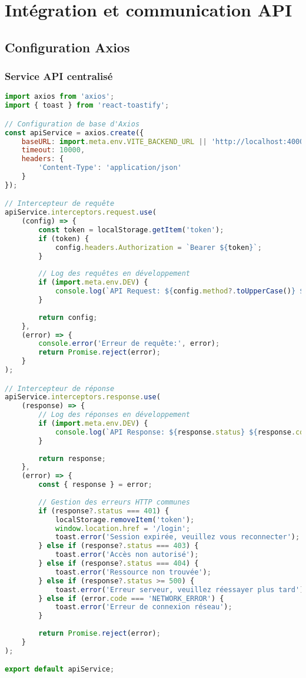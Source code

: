 \section{Intégration et communication API}

\subsection{Configuration Axios}

\subsubsection{Service API centralisé}

\begin{lstlisting}[language=JavaScript, caption=apiService.js]
import axios from 'axios';
import { toast } from 'react-toastify';

// Configuration de base d'Axios
const apiService = axios.create({
    baseURL: import.meta.env.VITE_BACKEND_URL || 'http://localhost:4000',
    timeout: 10000,
    headers: {
        'Content-Type': 'application/json'
    }
});

// Intercepteur de requête
apiService.interceptors.request.use(
    (config) => {
        const token = localStorage.getItem('token');
        if (token) {
            config.headers.Authorization = `Bearer ${token}`;
        }
        
        // Log des requêtes en développement
        if (import.meta.env.DEV) {
            console.log(`API Request: ${config.method?.toUpperCase()} ${config.url}`);
        }
        
        return config;
    },
    (error) => {
        console.error('Erreur de requête:', error);
        return Promise.reject(error);
    }
);

// Intercepteur de réponse
apiService.interceptors.response.use(
    (response) => {
        // Log des réponses en développement
        if (import.meta.env.DEV) {
            console.log(`API Response: ${response.status} ${response.config.url}`);
        }
        
        return response;
    },
    (error) => {
        const { response } = error;
        
        // Gestion des erreurs HTTP communes
        if (response?.status === 401) {
            localStorage.removeItem('token');
            window.location.href = '/login';
            toast.error('Session expirée, veuillez vous reconnecter');
        } else if (response?.status === 403) {
            toast.error('Accès non autorisé');
        } else if (response?.status === 404) {
            toast.error('Ressource non trouvée');
        } else if (response?.status >= 500) {
            toast.error('Erreur serveur, veuillez réessayer plus tard');
        } else if (error.code === 'NETWORK_ERROR') {
            toast.error('Erreur de connexion réseau');
        }
        
        return Promise.reject(error);
    }
);

export default apiService;
\end{lstlisting}

